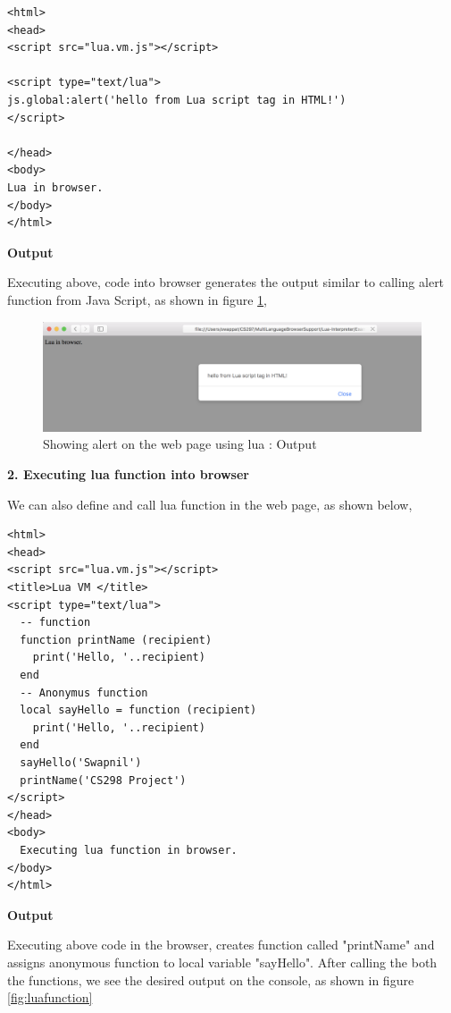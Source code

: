\begin{lstlisting}[frame=single]
<html>
<head>
<script src="lua.vm.js"></script>

<script type="text/lua">
js.global:alert('hello from Lua script tag in HTML!')
</script>

</head>
<body>
Lua in browser.
</body>
</html>
\end{lstlisting}

\textbf{Output}

Executing above, code into browser generates the output similar to calling alert function from Java Script, as shown in figure \ref{fig:luaalert}, 

\begin{figure}[H]
	\begin{center}
		\includegraphics[width=\linewidth]{./images/lua-alert.png}
	\end{center}
	\caption{Showing alert on the web page using lua : Output}
	\label{fig:luaalert}
\end{figure}

\textbf{2. Executing lua function into browser}

We can also define and call lua function in the web page, as shown below,

\begin{lstlisting}[frame=single]  
<html>
<head>
<script src="lua.vm.js"></script>
<title>Lua VM </title>
<script type="text/lua">
  -- function
  function printName (recipient)
    print('Hello, '..recipient)
  end
  -- Anonymus function
  local sayHello = function (recipient)
    print('Hello, '..recipient)
  end
  sayHello('Swapnil')
  printName('CS298 Project')
</script>
</head>
<body>
  Executing lua function in browser.
</body>
</html>
\end{lstlisting}

\textbf{Output}

Executing above code in the browser, creates function called "printName" and assigns anonymous function to local variable "sayHello". After calling the both the functions, we see the desired output on the console, as shown in figure \ref{fig:luafunction}

